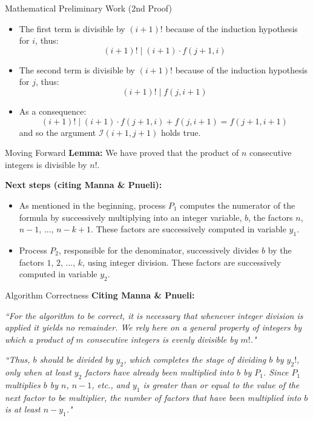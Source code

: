 \documentclass[xcolor=dvipsnames]{beamer}
\begin{document}
\begin{frame}{Mathematical Preliminary Work (2nd Proof)}
\begin{itemize}
    \item<1-> The first term is divisible by $(i+1)!$ because of the induction hypothesis for $i$, thus:
    \[
        (i+1)! \mid (i+1)\cdot f(j+1, i)
    \]
    \item<2-> The second term is divisible by $(i+1)!$ because of the induction hypothesis for $j$, thus:
    \[
        (i+1)! \mid f(j, i+1)
    \]
    \item<3-> As a consequence:
    \[
        (i+1)! \mid (i+1)\cdot f(j+1, i) + f(j, i+1) = f(j+1, i+1)
    \]
    and so the argument $\mathcal{I}(i+1, j+1)$ holds true.
\end{itemize}
\end{frame}

\begin{frame}{Moving Forward}
	\textbf{Lemma:} We have proved that the product of $n$ consecutive integers is divisible by $n!$.
	
	\hfill
	
	\pause
	
	\textbf{Next steps (citing Manna \& Pnueli):} 
	\begin{itemize}
		\item<2-> As mentioned in the beginning, process $P_1$ computes the numerator of the formula by successively multiplying into an integer variable, $b$, the factors $n$, $n-1$, ..., $n-k+1$. These factors are successively computed in variable $y_1$.
		
		\item<3-> Process $P_2$, responsible for the denominator, successively divides $b$ by the factors $1$, $2$, ..., $k$, using integer division. These factors are successively computed in variable $y_2$. 
	\end{itemize}
\end{frame}

\begin{frame}{Algorithm Correctness}
\textbf{Citing Manna \& Pnueli:}
 
\hfill

\textit{``For the algorithm to be correct, it is necessary that whenever integer division is applied it yields no remainder. We rely here on a general property of integers by which a product of $m$ consecutive integers is evenly divisible by $m!$."}

\hfill
\pause

\textit{``Thus, $b$ should be divided by $y_2$, which completes the stage of dividing $b$ by $y_2!$, only when at least $y_2$ factors have already been multiplied into $b$ by $P_1$. Since $P_1$ multiplies $b$ by $n$, $n-1$, etc., and $y_1$ is greater than or equal to the value of the next factor to be multiplier, the number of factors that have been multiplied into $b$ is at least $n-y_1$."}

\end{frame}
\end{document}
